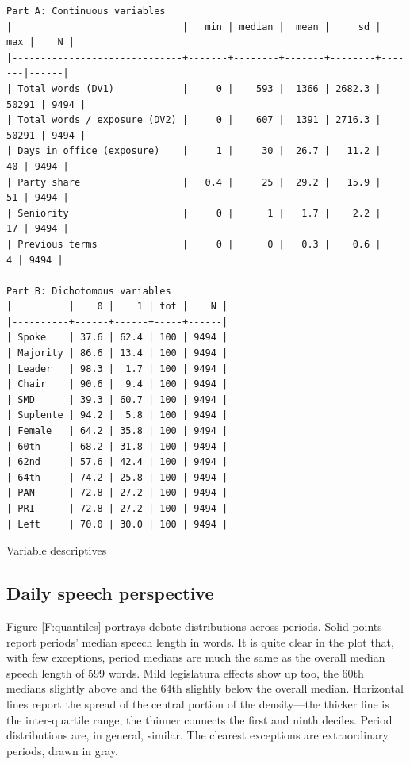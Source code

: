 \documentclass[letter,12pt]{article}
\begin{document}
\begin{table}
  \begin{footnotesize}
    \begin{verbatim}
Part A: Continuous variables
|                              |   min | median |  mean |     sd |   max |    N |
|------------------------------+-------+--------+-------+--------+-------|------|
| Total words (DV1)            |     0 |    593 |  1366 | 2682.3 | 50291 | 9494 |
| Total words / exposure (DV2) |     0 |    607 |  1391 | 2716.3 | 50291 | 9494 |
| Days in office (exposure)    |     1 |     30 |  26.7 |   11.2 |    40 | 9494 |
| Party share                  |   0.4 |     25 |  29.2 |   15.9 |    51 | 9494 |
| Seniority                    |     0 |      1 |   1.7 |    2.2 |    17 | 9494 |
| Previous terms               |     0 |      0 |   0.3 |    0.6 |     4 | 9494 |

Part B: Dichotomous variables
|          |    0 |    1 | tot |    N |
|----------+------+------+-----+------|
| Spoke    | 37.6 | 62.4 | 100 | 9494 |
| Majority | 86.6 | 13.4 | 100 | 9494 |
| Leader   | 98.3 |  1.7 | 100 | 9494 |
| Chair    | 90.6 |  9.4 | 100 | 9494 |
| SMD      | 39.3 | 60.7 | 100 | 9494 |
| Suplente | 94.2 |  5.8 | 100 | 9494 |
| Female   | 64.2 | 35.8 | 100 | 9494 |
| 60th     | 68.2 | 31.8 | 100 | 9494 |
| 62nd     | 57.6 | 42.4 | 100 | 9494 |
| 64th     | 74.2 | 25.8 | 100 | 9494 |
| PAN      | 72.8 | 27.2 | 100 | 9494 |
| PRI      | 72.8 | 27.2 | 100 | 9494 |
| Left     | 70.0 | 30.0 | 100 | 9494 |
    \end{verbatim}
  \end{footnotesize}
\caption{Variable descriptives}\label{T:descriptives}
\end{table}
  
  \subsection{Daily speech perspective}

Figure \ref{F:quantiles} portrays debate distributions across periods. Solid points report periods' median speech length in words. It is quite clear in the plot that, with few exceptions, period medians are much the same as the overall median speech length of 599 words. Mild legislatura effects show up too, the 60th medians slightly above and the 64th slightly below the overall median. Horizontal lines report the spread of the central portion of the density---the thicker line is the inter-quartile range, the thinner connects the first and ninth deciles. Period distributions are, in general, similar. The clearest exceptions are extraordinary periods, drawn in gray. 
\end{document}
